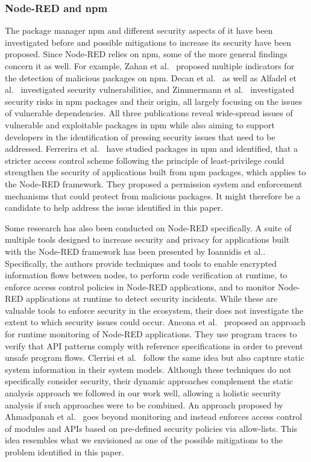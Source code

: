 \subsubsection{Node-RED and npm}
The package manager npm and different security aspects of it have been investigated before and possible mitigations to increase its security have been proposed.
Since Node-RED relies on npm, some of the more general findings concern it as well.
For example, Zahan et al.~\cite{Zahan22_npm_weak_links} proposed multiple indicators for the detection of malicious packages on npm.
Decan et al.~\cite{Decan18_npm_vulnerabilities} as well as Alfadel et al.~\cite{Alfadel20_npm_vulnerable_dependencies} investigated security vulnerabilities, and Zimmermann et al.~\cite{Zimmermann19_npm_security_threats} investigated security risks in npm packages and their origin, all largely focusing on the issues of vulnerable dependencies.
All three publications reveal wide-spread issues of vulnerable and exploitable packages in npm while also aiming to support developers in the identification of pressing security issues that need to be addressed.
Ferrerira et al.~\cite{Ferreira21_npm_permission_system} have studied packages in npm and identified, that a stricter access control scheme following the principle of least-privilege could strengthen the security of applications built from npm packages, which applies to the Node-RED framework.
They proposed a permission system and enforcement mechanisms that could protect from malicious packages.
It might therefore be a candidate to help address the issue identified in this paper.

Some reseearch has also been conducted on Node-RED specifically.
A suite of multiple tools designed to increase security and privacy for applications built with the Node-RED framework has been presented by Ioannidis et al.\cite{Ioannidis23_securing_the_flow}. 
Specifically, the authors provide techniques and tools to enable encrypted information flows between nodes, to perform code verification at runtime, to enforce access control policies in Node-RED applications, and to monitor Node-RED applications at runtime to detect security incidents.
While these are valuable tools to enforce security in the ecosystem, their does not investigate the extent to which security issues could occur.
Ancona et al.~\cite{Ancona18_runtime_monitoring} proposed an approach for runtime monitoring of Node-RED applications.
They use program traces to verify that API patterns comply with reference specifications in order to prevent unsafe program flows.
Clerrisi et al.~\cite{Clerissi18_testing_nodered} follow the same idea but also capture static system information in their system models.
Although these techniques do not specifically consider security, their dynamic  approaches complement the static analysis approach we followed in our work well, allowing a holistic security analysis if such approaches were to be combined.
An approach proposed by Ahmadpanah et al.~\cite{Ahmadpanah21_securing_nodered} goes beyond monitoring and instead enforces access control of modules and APIs based on pre-defined security policies via allow-lists.
This idea resembles what we envisioned as one of the possible mitigations to the problem identified in this paper.

